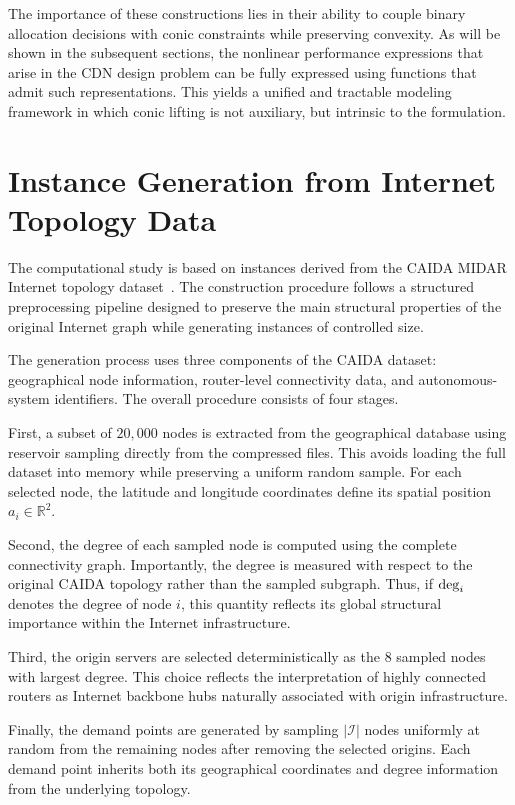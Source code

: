 \documentclass[a4paper,11pt,reqno]{amsart}
\newcommand{\I}{\mathcal{I}}
\begin{document}
The importance of these constructions lies in their ability to couple binary allocation decisions with conic constraints while preserving convexity. As will be shown in the subsequent sections, the nonlinear performance expressions that arise in the CDN design problem can be fully expressed using functions that admit such representations. This yields a unified and tractable modeling framework in which conic lifting is not auxiliary, but intrinsic to the formulation.

\section{Instance Generation from Internet Topology Data}\label{app:instances}

The computational study is based on instances derived from the CAIDA MIDAR Internet topology dataset~\citep{ITDK}. The construction procedure follows a structured preprocessing pipeline designed to preserve the main structural properties of the original Internet graph while generating instances of controlled size.

The generation process uses three components of the CAIDA dataset: geographical node information, router-level connectivity data, and autonomous-system identifiers. The overall procedure consists of four stages.

First, a subset of $20{,}000$ nodes is extracted from the geographical database using reservoir sampling directly from the compressed files. This avoids loading the full dataset into memory while preserving a uniform random sample. For each selected node, the latitude and longitude coordinates define its spatial position $a_i \in \mathbb{R}^2$.

Second, the degree of each sampled node is computed using the complete connectivity graph. Importantly, the degree is measured with respect to the original CAIDA topology rather than the sampled subgraph. Thus, if ${\rm deg}_i$ denotes the degree of node $i$, this quantity reflects its global structural importance within the Internet infrastructure.

Third, the origin servers are selected deterministically as the $8$ sampled nodes with largest degree. This choice reflects the interpretation of highly connected routers as Internet backbone hubs naturally associated with origin infrastructure.

Finally, the demand points are generated by sampling $|\I|$ nodes uniformly at random from the remaining nodes after removing the selected origins. Each demand point inherits both its geographical coordinates and degree information from the underlying topology.
\end{document}
